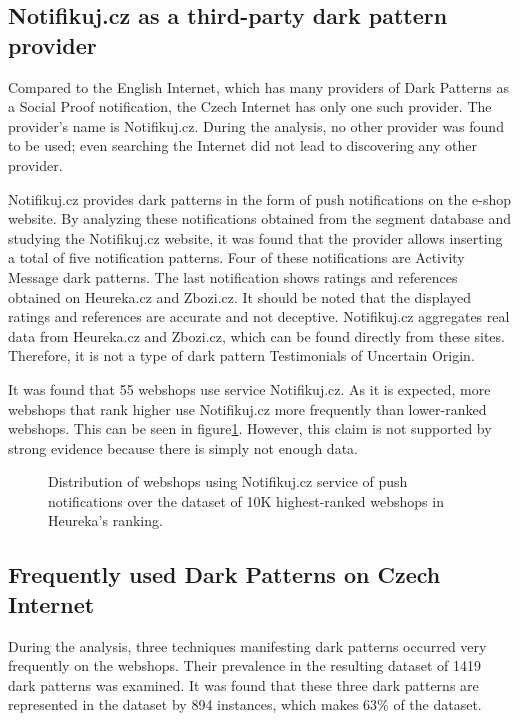     
    \subsection{Notifikuj.cz as a third-party dark pattern provider}
    Compared to the English Internet, which has many providers of Dark Patterns as a Social Proof notification\cite{dark-patterns-at-scale}, the Czech Internet has only one such provider. The provider's name is Notifikuj.cz. During the analysis, no other provider was found to be used; even searching the Internet did not lead to discovering any other provider.
    
    Notifikuj.cz provides dark patterns in the form of push notifications on the e-shop website. By analyzing these notifications obtained from the segment database and studying the Notifikuj.cz website, it was found that the provider allows inserting a total of five notification patterns. Four of these notifications are Activity Message dark patterns. The last notification shows ratings and references obtained on Heureka.cz and Zbozi.cz. It should be noted that the displayed ratings and references are accurate and not deceptive. Notifikuj.cz aggregates real data from Heureka.cz and Zbozi.cz, which can be found directly from these sites. Therefore, it is not a type of dark pattern Testimonials of Uncertain Origin.
    
    It was found that 55 webshops use service Notifikuj.cz. As it is expected, more webshops that rank higher use Notifikuj.cz more frequently than lower-ranked webshops. This can be seen in figure\ref{fig:notifikuj-histogram}. However, this claim is not supported by strong evidence because there is simply not enough data.
    
    \begin{figure}
        \begin{center}
            
        \end{center}
        \caption{Distribution of webshops using Notifikuj.cz service of push notifications over the dataset of 10K highest-ranked webshops in Heureka's ranking.}
        \label{fig:notifikuj-histogram}
    \end{figure}

    \subsection{Frequently used Dark Patterns on Czech Internet}
    During the analysis, three techniques manifesting dark patterns occurred very frequently on the webshops. Their prevalence in the resulting dataset of 1419 dark patterns was examined. It was found that these three dark patterns are represented in the dataset by 894 instances, which makes 63\% of the dataset.


